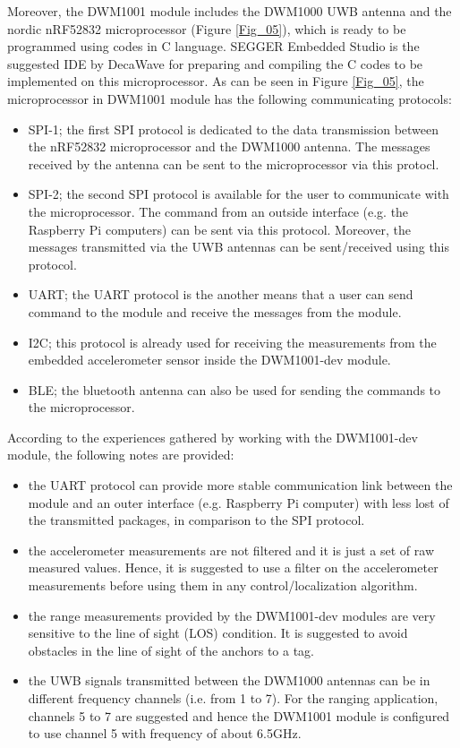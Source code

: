\documentclass{article}
\begin{document}
Moreover, the DWM1001 module includes the DWM1000 UWB antenna and the nordic nRF52832 microprocessor (Figure \ref{Fig_05}), which is ready to be programmed using codes in C language. SEGGER Embedded Studio is the suggested IDE by DecaWave for preparing and compiling the C codes to be implemented on this microprocessor. 
As can be seen in Figure \ref{Fig_05}, the microprocessor in DWM1001 module has the following communicating protocols:
\begin{itemize}
    \item SPI-1; the first SPI protocol is dedicated to the data transmission between the nRF52832 microprocessor and the DWM1000 antenna. The messages received by the antenna can be sent to the microprocessor via this protocl.
    \item SPI-2; the second SPI protocol is available for the user to communicate with the microprocessor. The command from an outside interface (e.g. the Raspberry Pi computers) can be sent via this protocol. Moreover, the messages transmitted via the UWB antennas can be sent/received using this protocol. 
    \item UART; the UART protocol is the another means that a user can send command to the module and receive the messages from the module. 
    \item I2C; this protocol is already used for receiving the measurements from the embedded accelerometer sensor inside the DWM1001-dev module. 
    \item BLE; the bluetooth antenna can also be used for sending the commands to the microprocessor.
\end{itemize}

According to the experiences gathered by working with the DWM1001-dev module, the following notes are provided:
\begin{itemize}
    \item the UART protocol can provide more stable communication link between the module and an outer interface (e.g. Raspberry Pi computer) with less lost of the transmitted packages, in comparison to the SPI protocol.
    \item the accelerometer measurements are not filtered and it is just a set of raw measured values. Hence, it is suggested to use a filter on the accelerometer measurements before using them in any control/localization algorithm.
    \item the range measurements provided by the DWM1001-dev modules are very sensitive to the line of sight (LOS) condition. It is suggested to avoid obstacles in the line of sight of the anchors to a tag.
    \item the UWB signals transmitted between the DWM1000 antennas can be in different frequency channels (i.e. from 1 to 7). For the ranging application, channels 5 to 7 are suggested and hence the DWM1001 module is configured to use channel 5 with frequency of about 6.5GHz.
\end{itemize}
\end{document}
